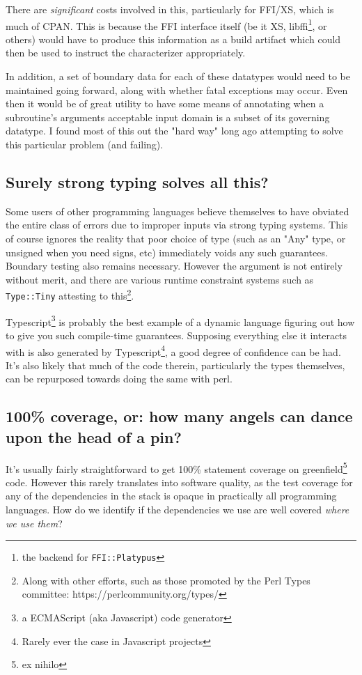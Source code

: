 \documentclass{article}
\begin{document}
There are \textit{significant} costs involved in this, particularly for FFI/XS, which is much of CPAN.
This is because the FFI interface itself (be it XS, libffi\footnote{the backend for \texttt{FFI::Platypus}}, or others) would have to produce this information as a build artifact
which could then be used to instruct the characterizer appropriately.

In addition, a set of boundary data for each of these datatypes would need to be maintained going forward, along with whether fatal exceptions may occur.
Even then it would be of great utility to have some means of annotating when a subroutine's arguments acceptable input domain is a subset of its governing datatype.
I found most of this out the "hard way" \cite{gsb} long ago attempting to solve this particular problem (and failing).

\subsection{Surely strong typing solves all this?}

Some users of other programming languages believe themselves to have obviated the entire class of errors due to improper inputs via strong typing systems.
This of course ignores the reality that poor choice of type (such as an "Any" type, or unsigned when you need signs, etc) immediately voids any such guarantees.
Boundary testing also remains necessary.
However the argument is not entirely without merit, and there are various runtime constraint systems such as \texttt{Type::Tiny} attesting to this\footnote{Along with other efforts, such as those promoted by the Perl Types committee: https://perlcommunity.org/types/}.

Typescript\footnote{a ECMAScript (aka Javascript) code generator} is probably the best example of a dynamic language figuring out how to give you such compile-time guarantees.
Supposing everything else it interacts with is also generated by Typescript\footnote{Rarely ever the case in Javascript projects}, a good degree of confidence can be had.
It's also likely that much of the code therein, particularly the types themselves, can be repurposed towards doing the same with perl.

\subsection{100\% coverage, or: how many angels can dance upon the head of a pin?}

It's usually fairly straightforward to get 100\% statement coverage on greenfield\footnote{ex nihilo} code.
However this rarely translates into software quality, as the test coverage for any of the dependencies in the stack is opaque in practically all programming languages.
How do we identify if the dependencies we use are well covered \textit{where we use them}?
\end{document}
